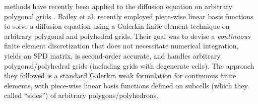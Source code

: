 \documentclass[preprint,10pt]{elsarticle}
\begin{document}
methods have recently been applied to the diffusion equation on arbitrary polygonal 
grids \cite{Kuznetsov2004,Brezzi2005,LipnikovShashkovSvyatskiy2006,LipnikovShashkov2010}.
%
Bailey et al. \cite{BaileyAdams2008} recently employed piece-wise linear basis
functions to solve a diffusion equation using a Galerkin finite element technique on 
arbitrary polygonal and polyhedral grids. Their goal was to devise a {\em continuous} finite 
element discretization that does not necessitate numerical integration, yields an SPD matrix, 
is second-order accurate, and handles arbitrary polygonal/polyhedral grids (including 
grids with degenerate cells). The approach they followed is a standard Galerkin weak 
formulation for continuous finite elements, with piece-wise linear basis functions 
defined on subcells (which they called ``sides'') of arbitrary polygons/polyhedrons.
\end{document}
